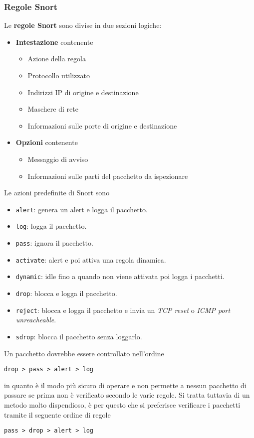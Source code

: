 \subsubsection{Regole Snort}
Le \textbf{regole Snort} sono divise in due sezioni logiche:
\begin{itemize}
	\item \textbf{Intestazione} contenente
	      \begin{itemize}
		      \item Azione della regola
		      \item Protocollo utilizzato
		      \item Indirizzi IP di origine e destinazione
		      \item Maschere di rete
		      \item Informazioni sulle porte di origine e destinazione
	      \end{itemize}
	\item \textbf{Opzioni} contenente
	      \begin{itemize}
		      \item Messaggio di avviso
		      \item Informazioni sulle parti del pacchetto da ispezionare
	      \end{itemize}
\end{itemize}
Le azioni predefinite di Snort sono
\begin{itemize}
	\item \verb|alert|: genera un alert e logga il pacchetto.
	\item \verb|log|: logga il pacchetto.
	\item \verb|pass|: ignora il pacchetto.
	\item \verb|activate|: alert e poi attiva una regola dinamica.
	\item \verb|dynamic|: idle fino a quando non viene attivata poi logga i pacchetti.
	\item \verb|drop|: blocca e logga il pacchetto.
	\item \verb|reject|: blocca e logga il pacchetto e invia un \emph{TCP reset} o \emph{ICMP port unreacheable}.
	\item \verb|sdrop|: blocca il pacchetto senza loggarlo.
\end{itemize}
Un pacchetto dovrebbe essere controllato nell'ordine
\begin{center}
	\verb|drop > pass > alert > log|
\end{center}
in quanto è il modo più sicuro di operare e non permette a nessun pacchetto di passare se prima non è verificato
secondo le varie regole. Si tratta tuttavia di un metodo molto dispendioso, è per questo che si preferisce verificare
i pacchetti tramite il seguente ordine di regole
\begin{center}
	\verb|pass > drop > alert > log|
\end{center}


